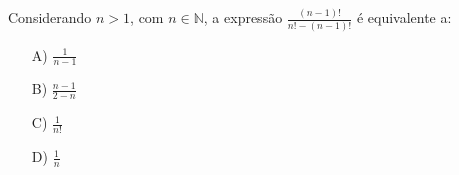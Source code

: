 Considerando $n>1$, com $n\in \mathbb{N}$, a expressão $\frac{(n-1)!}{n!-(n-1)!}$ é equivalente a:
\begin{enumerate}
\item [A)] $\frac{1}{n-1}$
\item [B)] $\frac{n-1}{2-n}$
\item [C)] $\frac{1}{n!}$
\item [D)] $\frac{1}{n}$
\end{enumerate}